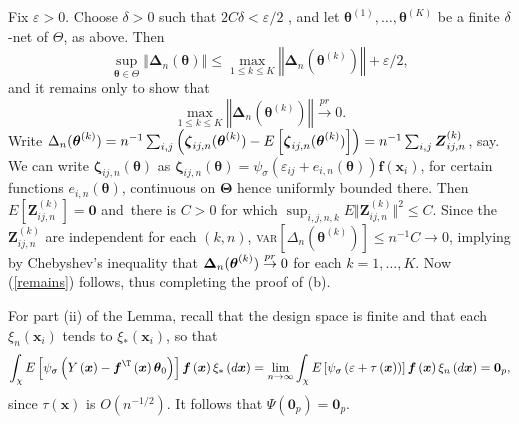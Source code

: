 \documentclass[times, authoryear, 12pt, twoside]{elsarticle}
\begin{document}
Fix $\varepsilon >0$. Choose $\delta >0$ such that $2C\delta <\varepsilon /2$%
, and let $\boldsymbol{\theta }^{(1)},\dots ,\boldsymbol{\theta }^{(K)}$ be
a finite $\delta $-net of $\Theta $, as above. Then 
\begin{equation*}
\sup_{\boldsymbol{\theta }\in \Theta }\left\Vert \boldsymbol{\Delta }_{n}(%
\boldsymbol{\theta })\right\Vert \leq \max_{1\leq k\leq K}\left\Vert 
\boldsymbol{\Delta }_{n}(\boldsymbol{\theta }^{(k)})\right\Vert +\varepsilon
/2,
\end{equation*}%
and it remains only to show that 
\begin{equation}
\max_{1\leq k\leq K}\left\Vert \boldsymbol{\Delta }_{n}(\boldsymbol{\theta }%
^{(k)})\right\Vert \overset{pr}{\rightarrow }0.  \label{remains}
\end{equation}%
Write $\Delta _{n}(\boldsymbol{\theta }^{(k)})=n^{-1}\sum_{i,j}\left( 
\boldsymbol{\zeta }_{ij,n}(\boldsymbol{\theta }^{(k)})-E\left[ \boldsymbol{%
\zeta }_{ij,n}(\boldsymbol{\theta }^{(k)})\right] \right) =n^{-1}\sum_{i,j}%
\boldsymbol{Z}_{ij,n}^{(k)}$, say. We can write $\boldsymbol{\zeta }_{ij,n}(%
\boldsymbol{\theta })$ as $\boldsymbol{\zeta }_{ij,n}(\boldsymbol{\theta })=\psi _{\sigma }\!\left(
\varepsilon _{ij}+e_{i,n}\left( \boldsymbol{\theta }\right) \right) 
\boldsymbol{f}(\boldsymbol{x}_{i})
$,
for certain functions $e_{i,n}\left( \boldsymbol{\theta }\right) $,
continuous on $\boldsymbol{\Theta }$ hence uniformly bounded there. Then $E[%
\boldsymbol{Z}_{ij,n}^{(k)}]=\boldsymbol{0}$ and{\ there is }$C>0$ for which 
{$\sup_{i,j,n,k}E\Vert \boldsymbol{Z}_{ij,n}^{(k)}\Vert ^{2}\leq C$}. Since
the $\boldsymbol{Z}_{ij,n}^{(k)}$ are independent for each $(k,n)$, \textsc{%
var}$\left[ \Delta _{n}(\boldsymbol{\theta }^{(k)})\right] \leq
n^{-1}C\rightarrow 0$, implying by Chebyshev's inequality that $\boldsymbol{%
\Delta }_{n}(\boldsymbol{\theta }^{(k)})\overset{pr}{\rightarrow }0$ for
each $k=1,\dots ,K$. Now (\ref{remains}) follows, thus completing the proof
of (b).

For part (ii) of the Lemma, recall that the design space
is finite and that each $\xi _{n}\left( \boldsymbol{x}_{i}\right) $ tends to 
$\xi _{\ast }\left( \boldsymbol{x}_{i}\right) $, so that
\begin{equation}
\int_{\mathcal{\chi }}E\left[ \psi _{\sigma }\left( Y\left( \boldsymbol{x}%
\right) -\boldsymbol{f}^{\T }\left( \boldsymbol{x}\right) \boldsymbol{%
\theta }_{0}\right) \right] \boldsymbol{f}\left( \boldsymbol{x}\right) \xi
_{\ast }\left( d\boldsymbol{x}\right) =\lim_{n\rightarrow \infty }\int_{%
\mathcal{\chi }}E\left[ \psi _{\sigma }\left( \varepsilon +\tau \left( 
\boldsymbol{x}\right) \right) \right] \boldsymbol{f}\left( \boldsymbol{x}%
\right) \xi _{n}\left( d\boldsymbol{x}\right) =\boldsymbol{0}_p,  \label{root}
\end{equation}%
since $\tau \left( \boldsymbol{x}\right) $ is $O\left( n^{-1/2}\right) $. It
follows that $\Psi \left( \boldsymbol{0}_p\right) =\boldsymbol{0}_p $.
\end{document}
